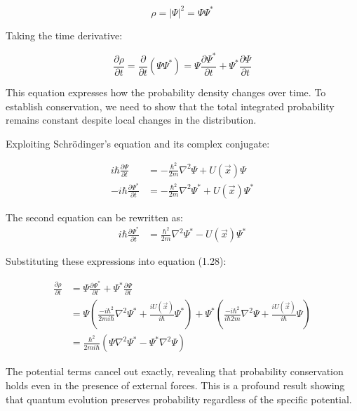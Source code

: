 \documentclass[italian]{HKNdocument}
\begin{document}
\begin{equation*}
\rho=|\Psi|^{2}=\Psi \Psi^{*} \tag{1.27}
\end{equation*}

Taking the time derivative:

\begin{equation*}
\frac{\partial \rho}{\partial t}=\frac{\partial}{\partial t}(\Psi \Psi^{*})=\Psi \frac{\partial \Psi^{*}}{\partial t}+\Psi^{*} \frac{\partial \Psi}{\partial t} \tag{1.28}
\end{equation*}

This equation expresses how the probability density changes over time. To establish conservation, we need to show that the total integrated probability remains constant despite local changes in the distribution.


Exploiting Schrödinger's equation and its complex conjugate:

\begin{align*}
i \hbar \frac{\partial \Psi}{\partial t} &= -\frac{\hbar^{2}}{2 m} \nabla^{2} \Psi+U(\vec{x}) \Psi \\
-i \hbar \frac{\partial \Psi^{*}}{\partial t} &= -\frac{\hbar^{2}}{2 m} \nabla^{2} \Psi^{*}+U(\vec{x}) \Psi^{*} \tag{1.29}
\end{align*}

The second equation can be rewritten as:
\begin{align*}
i \hbar \frac{\partial \Psi^{*}}{\partial t} &= \frac{\hbar^{2}}{2 m} \nabla^{2} \Psi^{*}-U(\vec{x}) \Psi^{*}
\end{align*}

Substituting these expressions into equation (1.28):

\begin{align*}
\frac{\partial \rho}{\partial t} &= \Psi \frac{\partial \Psi^{*}}{\partial t}+\Psi^{*} \frac{\partial \Psi}{\partial t} \\
&= \Psi\left(\frac{-i\hbar^{2}}{2m i\hbar} \nabla^{2} \Psi^{*}+\frac{iU(\vec{x})}{i\hbar} \Psi^{*}\right)+\Psi^{*}\left(\frac{-i\hbar^{2}}{i\hbar 2 m} \nabla^{2} \Psi+\frac{iU(\vec{x})}{i\hbar} \Psi\right) \tag{1.30}\\
&= \frac{\hbar^{2}}{2m i\hbar}\left(\Psi \nabla^{2} \Psi^{*}-\Psi^{*} \nabla^{2} \Psi\right)
\end{align*}

The potential terms cancel out exactly, revealing that probability conservation holds even in the presence of external forces. This is a profound result showing that quantum evolution preserves probability regardless of the specific potential.
\end{document}
